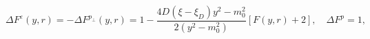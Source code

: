 \begin{equation}\label{deltaFyr}
  \Delta F^{\varepsilon }(y,r)=-\Delta F^{p_{\perp } }(y,r)=1-
  \frac{4D(\xi -\xi _D)y^2-m_0^2}{2(y^2-m_0^2)}[F(y,r)+2],\quad
  \Delta F^{p}=1,
\end{equation}

